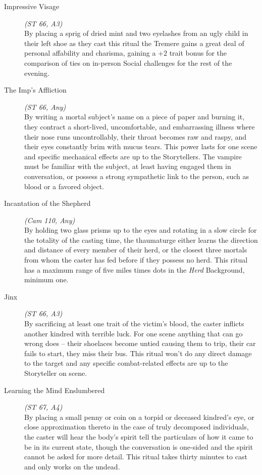 \begin{description}
	\item[Impressive Visage] \emph{(ST 66, A3)} \hfill \\
	By placing a sprig of dried mint and two eyelashes from an ugly child in their left shoe as they cast this ritual the 
	Tremere gains a great deal of personal affability and charisma, gaining a +2 trait bonus for the comparison of ties 
	on in-person Social challenges for the rest of the evening. \\
	
	\item[The Imp's Affliction] \emph{(ST 66, Any)} \hfill \\
	By writing a mortal subject's name on a piece of paper and burning it, they contract a short-lived, uncomfortable, and 
	embarrassing illness where their nose runs uncontrollably, their throat becomes raw and raspy, and their eyes constantly 
	brim with mucus tears.  This power lasts for one scene and specific mechanical effects are up to the Storytellers. The 
	vampire must be familiar with the subject, at least having engaged them in conversation, or possess a strong sympathetic 
	link to the person, such as blood or a favored object. \\
	
	\item[Incantation of the Shepherd] \emph{(Cam 110, Any)} \hfill \\
	By holding two glass prisms up to the eyes and rotating in a slow circle for the totality of the casting time, the 
	thaumaturge either learns the direction and distance of every member of their herd, or the closest three mortals from 
	whom the caster has fed before if they possess no herd.  This ritual has a maximum range of five miles times dots in the 
	\emph{Herd} Background, minimum one. \\

	\item[Jinx] \emph{(ST 66, A3)} \hfill \\
	By sacrificing at least one trait of the victim's blood, the caster inflicts another kindred with terrible luck.  For one 
	scene anything that can go wrong does -- their shoelaces become untied causing them to trip, their car fails to start, they 
	miss their bus.  This ritual won't do any direct damage to the target and any specific combat-related effects are up to the 
	Storyteller on scene. \\
	
	\item[Learning the Mind Enslumbered] \emph{(ST 67, A4)} \hfill \\
	By placing a small penny or coin on a torpid or deceased kindred's eye, or close approximation thereto in the case of truly 
	decomposed individuals, the caster will hear the body's spirit tell the particulars of how it came to be in its current 
	state, though the conversation is one-sided and the spirit cannot be asked for more detail.  This ritual takes thirty minutes 
	to cast and only works on the undead. \\


\end{description}
